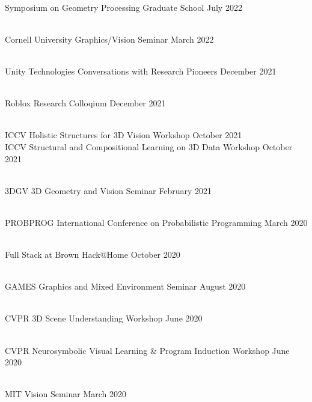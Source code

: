 \documentclass[line,margin]{res}
\begin{document}
\begin{resume}
\\
\talk
	{Symposium on Geometry Processing}
	{Graduate School}
	{July 2022}

\\
\talk
	{Cornell University}
	{Graphics/Vision Seminar}
	{March 2022}

\\
\talk
	{Unity Technologies}
	{Conversations with Research Pioneers}
	{December 2021}

\\
\talk
	{Roblox}
	{Research Colloqium}
	{December 2021}

\\
\talk
	{ICCV}
	{Holistic Structures for 3D Vision Workshop}
	{October 2021}
\\
\talk
	{ICCV}
	{Structural and Compositional Learning on 3D Data Workshop}
	{October 2021}

\\
\talk
	{3DGV}
	{3D Geometry and Vision Seminar}
	{February 2021}

\\
\talk
	{PROBPROG}
	{International Conference on Probabilistic Programming}
	{March 2020}

\\
\talk
	{Full Stack at Brown}
	{Hack@Home}
	{October 2020}

\\
\talk
	{GAMES}
	{Graphics and Mixed Environment Seminar}
	{August 2020}

\\
\talk
	{CVPR}
	{3D Scene Understanding Workshop}
	{June 2020}

\\
\talk
	{CVPR}
	{Neurosymbolic Visual Learning \& Program Induction Workshop}
	{June 2020}

\\
\talk
	{MIT}
	{Vision Seminar}
	{March 2020}


\end{resume}
\end{document}
